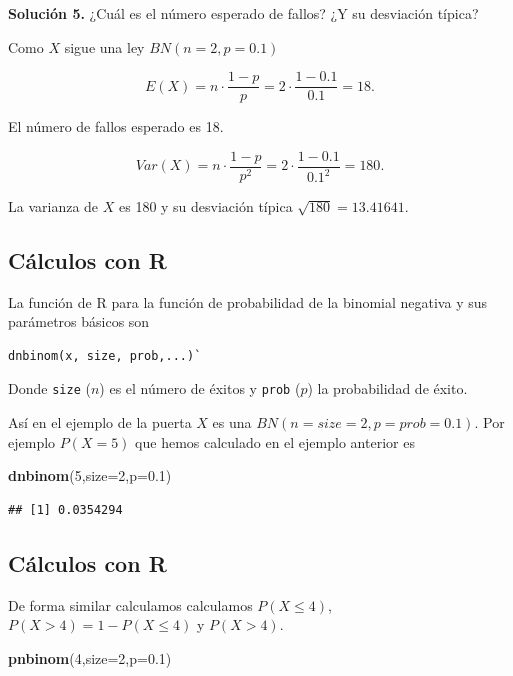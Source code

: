 \documentclass[]{book}
\newenvironment{Shaded}{\begin{snugshade}}{\end{snugshade}}
\newcommand{\DataTypeTok}[1]{\textcolor[rgb]{0.13,0.29,0.53}{#1}}
\newcommand{\DecValTok}[1]{\textcolor[rgb]{0.00,0.00,0.81}{#1}}
\newcommand{\FloatTok}[1]{\textcolor[rgb]{0.00,0.00,0.81}{#1}}
\newcommand{\KeywordTok}[1]{\textcolor[rgb]{0.13,0.29,0.53}{\textbf{#1}}}
\newcommand{\NormalTok}[1]{#1}
\begin{document}
\textbf{Solución 5.} ¿Cuál es el número esperado de fallos? ¿Y su desviación típica?

Como \(X\) sigue una ley \(BN(n=2,p=0.1)\)

\[E(X)=n\cdot \frac{1-p}{p}=2\cdot \frac{1-0.1}{0.1}=18.\]

El número de fallos esperado es 18.

\[
Var(X)=n\cdot\frac{1-p}{p^2}=2 \cdot \frac{1-0.1}{0.1^2}=180.
\]

La varianza de \(X\) es 180 y su desviación típica \(\sqrt{180}=13.41641.\)

\hypertarget{cuxe1lculos-con-r-2}{%
\subsection{Cálculos con R}\label{cuxe1lculos-con-r-2}}

La función de R para la función de probabilidad de la binomial negativa y sus parámetros básicos son

\begin{verbatim}
dnbinom(x, size, prob,...)`
\end{verbatim}

Donde \texttt{size} (\(n\)) es el número de éxitos y \texttt{prob} (\(p\)) la probabilidad de éxito.

Así en el ejemplo de la puerta \(X\) es una \(BN(n=size=2,p=prob=0.1)\). Por ejemplo \(P(X=5)\) que hemos calculado en el ejemplo anterior es

\begin{Shaded}
\begin{Highlighting}[]
\KeywordTok{dnbinom}\NormalTok{(}\DecValTok{5}\NormalTok{,}\DataTypeTok{size=}\DecValTok{2}\NormalTok{,}\DataTypeTok{p=}\FloatTok{0.1}\NormalTok{)}
\end{Highlighting}
\end{Shaded}

\begin{verbatim}
## [1] 0.0354294
\end{verbatim}

\hypertarget{cuxe1lculos-con-r-3}{%
\subsection{Cálculos con R}\label{cuxe1lculos-con-r-3}}

De forma similar calculamos calculamos \(P(X\leq 4)\), \(P(X>4)=1-P(X\leq 4)\) y \(P(X>4)\).

\begin{Shaded}
\begin{Highlighting}[]
\KeywordTok{pnbinom}\NormalTok{(}\DecValTok{4}\NormalTok{,}\DataTypeTok{size=}\DecValTok{2}\NormalTok{,}\DataTypeTok{p=}\FloatTok{0.1}\NormalTok{)}
\end{Highlighting}
\end{Shaded}
\end{document}
